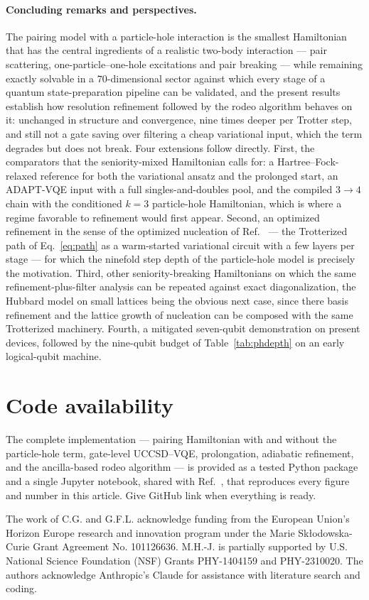 \documentclass[
  aps,            %
  prc,            %
  reprint,        %
  superscriptaddress,
  floatfix,
  nofootinbib
]{revtex4-2}
\begin{document}
\paragraph{Concluding remarks and perspectives.}
The pairing model with a particle-hole interaction is the smallest
Hamiltonian that has the central ingredients of a realistic two-body
interaction --- pair scattering, one-particle--one-hole excitations and pair
breaking --- while remaining exactly solvable in a $70$-dimensional sector
against which every stage of a quantum state-preparation pipeline can be
validated, and the present results establish how resolution refinement
followed by the rodeo algorithm behaves on it: unchanged in structure and
convergence, nine times deeper per Trotter step, and still not a gate saving
over filtering a cheap variational input, which the term degrades but does
not break.  Four extensions follow directly.  First, the comparators that
the seniority-mixed Hamiltonian calls for: a Hartree--Fock-relaxed
reference for both the variational ansatz and the prolonged start, an
ADAPT-VQE input with a full singles-and-doubles pool, and the compiled
$3\to4$ chain with the conditioned $k=3$ particle-hole Hamiltonian, which is
where a regime favorable to refinement would first appear.  Second, an
optimized refinement in the sense of the optimized nucleation of
Ref.~\cite{Sadia2026} --- the Trotterized path of Eq.~\eqref{eq:path} as a
warm-started variational circuit with a few layers per stage --- for which
the ninefold step depth of the particle-hole model is precisely the
motivation.  Third, other seniority-breaking Hamiltonians on which the same
refinement-plus-filter analysis can be repeated against exact
diagonalization, the Hubbard model on small lattices being the obvious next
case, since there basis refinement and the lattice growth of nucleation can
be composed with the same Trotterized machinery.  Fourth, a mitigated
seven-qubit demonstration on present devices, followed by the nine-qubit
budget of Table~\ref{tab:phdepth} on an early logical-qubit machine.

\section*{Code availability}
The complete implementation --- pairing Hamiltonian with and without the
particle-hole term, gate-level UCCSD--VQE, prolongation, adiabatic refinement,
and the ancilla-based rodeo algorithm --- is provided as a tested Python package
and a single Jupyter notebook, shared with Ref.~\cite{PairingCompanion}, that
reproduces every figure and number in this article.
Give GitHub link when everything is ready.
\begin{acknowledgments}
The work of C.G. and G.F.L. acknowledge funding from the
European Union’s Horizon Europe research and innovation program under the Marie Skłodowska-Curie Grant Agreement No.
101126636. M.H.-J. is partially supported by U.S. National Science Foundation
(NSF) Grants PHY-1404159 and PHY-2310020.
The authors  acknowledge Anthropic’s Claude
for assistance with literature search and coding.

\end{acknowledgments}
\end{document}
